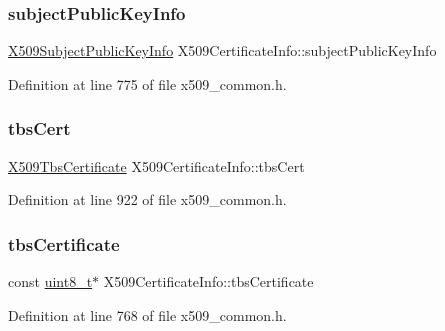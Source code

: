 \mbox{\label{structX509CertificateInfo_a1e15bfaddec61608bad974fa7385d225}} 
\subsubsection{\texorpdfstring{subject\+Public\+Key\+Info}{subjectPublicKeyInfo}}
{\footnotesize\ttfamily \hyperlink{structX509SubjectPublicKeyInfo}{X509\+Subject\+Public\+Key\+Info} X509\+Certificate\+Info\+::subject\+Public\+Key\+Info}



Definition at line 775 of file x509\+\_\+common.\+h.

\mbox{\label{structX509CertificateInfo_acfa4445df39031f204f8936a2eec189e}} 
\subsubsection{\texorpdfstring{tbs\+Cert}{tbsCert}}
{\footnotesize\ttfamily \hyperlink{structX509TbsCertificate}{X509\+Tbs\+Certificate} X509\+Certificate\+Info\+::tbs\+Cert}



Definition at line 922 of file x509\+\_\+common.\+h.

\mbox{\label{structX509CertificateInfo_a6f0f56fdd661c01753b5408a831f3dcd}} 
\subsubsection{\texorpdfstring{tbs\+Certificate}{tbsCertificate}}
{\footnotesize\ttfamily const \hyperlink{stdint_8h_aba7bc1797add20fe3efdf37ced1182c5}{uint8\+\_\+t}$\ast$ X509\+Certificate\+Info\+::tbs\+Certificate}



Definition at line 768 of file x509\+\_\+common.\+h.

